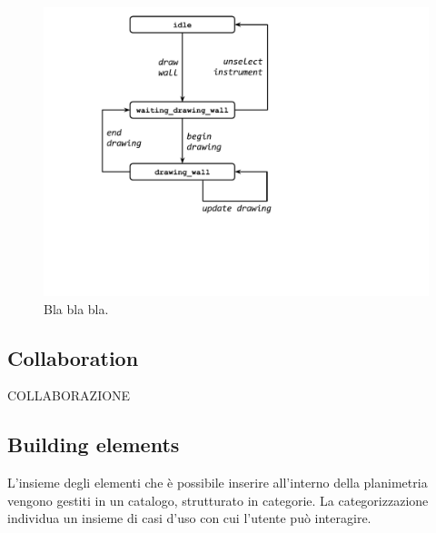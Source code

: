 \begin{figure}[!t]
\centering
\includegraphics[width=\linewidth]{contents/images/uc_draw_wall}

\caption{Bla bla bla.}
\label{fig_sim}
\end{figure}




\subsection{Collaboration}
    COLLABORAZIONE\\

\subsection{Building elements}

L'insieme degli elementi che è possibile inserire all'interno della planimetria vengono gestiti in un catalogo, strutturato in categorie.
La categorizzazione individua un insieme di casi d'uso con cui l'utente può interagire.

